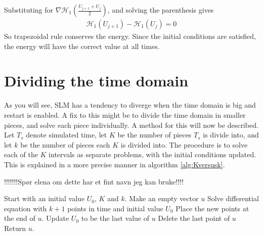 Substituting for $\nabla \mathcal{H}_1 (\frac{U_{j+1}  + U_j}{2})$, and solving the parenthesis gives
\begin{equation}
\begin{aligned}
\mathcal{H}_1(U_{j+1}) - \mathcal{H}_1(U_{j}) = 0
\end{aligned}
\end{equation}
So trapezoidal rule conserves the energy. Since the initial conditions are satisfied, the energy will have the correct value at all times.

\section{Dividing the time domain}%

As you will see, SLM has a tendency to diverge when the time domain is big and restart is enabled. A fix to this might be to divide the time domain in smaller pieces, and solve each piece individually. A method for this will now be described.\\ 

Let $T_s$ denote simulated time, let $K$ be the number of pieces $T_s$ is divide into, and let $k$ be the number of pieces each $K$ is divided into. The procedure is to solve each of the $K$ intervals as separate problems, with the initial conditions updated. This is explained in a more precise manner in algorithm \ref{alg:Kversusk}.

\begin{algorithm} [h!]
\begin{algorithmic} \caption{!!!!!!!Spør elena om dette har et fint navn jeg kan bruke!!!!} \label{alg:Kversusk}  
\STATE Start with an initial value $U_0$, $K$ and $k$.
\STATE Make an empty vector $u$
   \STATE Solve differential equation with $k+1$ points in time and initial value $U_0$
   \STATE Place the new points at the end of $u$.
   \STATE Update $U_0$ to be the last value of $u$ 
   \STATE Delete the last point of $u$
\ENDFOR
\STATE Return $u$.
\end{algorithmic} 
\end{algorithm}

